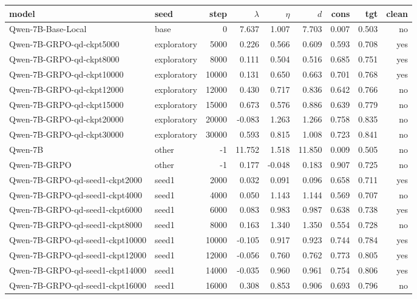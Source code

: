 \begin{tabular}{llrrrrrrr}
\toprule
model & seed & step & $\lambda$ & $\eta$ & $d$ & cons & tgt & clean \\
\midrule
Qwen-7B-Base-Local & base & 0 & 7.637 & 1.007 & 7.703 & 0.007 & 0.503 & no \\
Qwen-7B-GRPO-qd-ckpt5000 & exploratory & 5000 & 0.226 & 0.566 & 0.609 & 0.593 & 0.708 & yes \\
Qwen-7B-GRPO-qd-ckpt8000 & exploratory & 8000 & 0.111 & 0.504 & 0.516 & 0.685 & 0.751 & yes \\
Qwen-7B-GRPO-qd-ckpt10000 & exploratory & 10000 & 0.131 & 0.650 & 0.663 & 0.701 & 0.768 & yes \\
Qwen-7B-GRPO-qd-ckpt12000 & exploratory & 12000 & 0.430 & 0.717 & 0.836 & 0.642 & 0.766 & no \\
Qwen-7B-GRPO-qd-ckpt15000 & exploratory & 15000 & 0.673 & 0.576 & 0.886 & 0.639 & 0.779 & no \\
Qwen-7B-GRPO-qd-ckpt20000 & exploratory & 20000 & -0.083 & 1.263 & 1.266 & 0.758 & 0.835 & no \\
Qwen-7B-GRPO-qd-ckpt30000 & exploratory & 30000 & 0.593 & 0.815 & 1.008 & 0.723 & 0.841 & no \\
Qwen-7B & other & -1 & 11.752 & 1.518 & 11.850 & 0.009 & 0.505 & no \\
Qwen-7B-GRPO & other & -1 & 0.177 & -0.048 & 0.183 & 0.907 & 0.725 & no \\
Qwen-7B-GRPO-qd-seed1-ckpt2000 & seed1 & 2000 & 0.032 & 0.091 & 0.096 & 0.658 & 0.711 & yes \\
Qwen-7B-GRPO-qd-seed1-ckpt4000 & seed1 & 4000 & 0.050 & 1.143 & 1.144 & 0.569 & 0.707 & no \\
Qwen-7B-GRPO-qd-seed1-ckpt6000 & seed1 & 6000 & 0.083 & 0.983 & 0.987 & 0.638 & 0.738 & yes \\
Qwen-7B-GRPO-qd-seed1-ckpt8000 & seed1 & 8000 & 0.163 & 1.340 & 1.350 & 0.554 & 0.728 & no \\
Qwen-7B-GRPO-qd-seed1-ckpt10000 & seed1 & 10000 & -0.105 & 0.917 & 0.923 & 0.744 & 0.784 & yes \\
Qwen-7B-GRPO-qd-seed1-ckpt12000 & seed1 & 12000 & -0.056 & 0.760 & 0.762 & 0.773 & 0.805 & yes \\
Qwen-7B-GRPO-qd-seed1-ckpt14000 & seed1 & 14000 & -0.035 & 0.960 & 0.961 & 0.754 & 0.806 & yes \\
Qwen-7B-GRPO-qd-seed1-ckpt16000 & seed1 & 16000 & 0.308 & 0.853 & 0.906 & 0.693 & 0.796 & no \\

\end{tabular}
